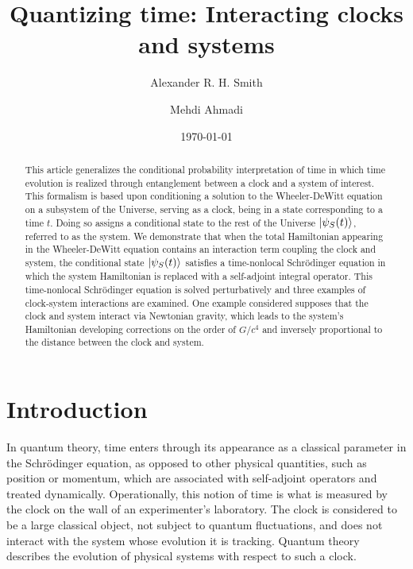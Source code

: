 \documentclass[a4paper,twocolumn,superscriptaddress,11pt,accepted=2019-06-04]{quantumarticle}
\begin{document}
\title{Quantizing time: Interacting clocks and systems}
\date{\today}
\author{Alexander R. H. Smith}

\author{Mehdi Ahmadi}

\maketitle

\begin{abstract}
This article generalizes the conditional probability interpretation of time in which time evolution is realized through entanglement between a clock and a system of interest. This formalism is based upon conditioning a solution to the Wheeler-DeWitt equation on a subsystem of the Universe, serving as a clock, being in a state corresponding to a time $t$. Doing so assigns a conditional state to the rest of the Universe $\ket{\psi_S(t)}$, referred to as the system. We demonstrate that when the total Hamiltonian appearing in the Wheeler-DeWitt equation contains an interaction term coupling the clock and system, the conditional state $\ket{\psi_S(t)}$ satisfies a time-nonlocal Schr\"{o}dinger equation in which the system Hamiltonian is replaced with a self-adjoint integral operator. This time-nonlocal Schr\"{o}dinger equation is solved perturbatively and three examples of clock-system interactions are examined. One example considered supposes that the clock and system interact via Newtonian gravity, which leads to the system's Hamiltonian developing corrections on the order of $G/c^4$ and inversely proportional to the distance between the clock and system.
\end{abstract}


\section{Introduction}
\label{Introduction}

In quantum theory, time enters through its appearance as a classical parameter in the Schr\"{o}dinger equation, as opposed to other physical quantities, such as position or momentum, which are associated with self-adjoint operators and treated dynamically. Operationally, this notion of time is what is measured by the clock on the wall of an experimenter's laboratory. The clock is considered to be a large classical object, not subject to quantum fluctuations, and does not interact with the system whose evolution it is tracking. Quantum theory describes the evolution of physical systems with respect to such a clock.
\end{document}
